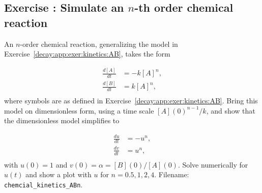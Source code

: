 \documentclass[graybox,sectrefs,envcountresetchap,open=right,final]{svmonodo}
\newenvironment{doconceexercise}{}{}
\newcounter{doconceexercisecounter}
\begin{document}
\begin{doconceexercise}

\subsection*{Exercise \thedoconceexercisecounter: Simulate an $n$-th order chemical reaction}

\label{decay:app:exer:kinetics:ABn}

An $n$-order chemical reaction, generalizing the model in
Exercise~\ref{decay:app:exer:kinetics:AB}, takes the form

\begin{align*}
\frac{d[A]}{dt} &= -k[A]^n,\\ 
\frac{d[B]}{dt} &= k[A]^n,\\ 
\end{align*}
where symbols are as defined in Exercise~\ref{decay:app:exer:kinetics:AB}.
Bring this model on dimensionless form, using a time scale $[A](0)^{n-1}/k$,
and show that the dimensionless model simplifies to

\begin{align*}
\frac{du}{dt} &= -u^n,\\ 
\frac{dv}{dt} &= u^n,\\ 
\end{align*}
with $u(0)=1$ and $v(0)=\alpha = [B](0)/[A](0)$. Solve numerically for
$u(t)$ and show a plot with $u$ for $n=0.5, 1, 2, 4$.
\noindent Filename: \Verb!chemcial_kinetics_ABn!.

\end{doconceexercise}
\end{document}
